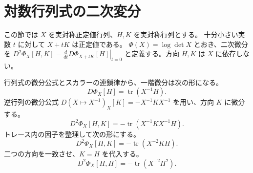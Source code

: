 \documentclass[a4paper,10pt]{ltjsarticle}
\begin{document}
\newpage
\section*{対数行列式の二次変分}
この節では $X$ を実対称正定値行列、$H,K$ を実対称行列とする。
十分小さい実数 $t$ に対して $X+tK$ は正定値である。
$\Phi(X)=\log\det X$ とおき、二次微分を
$D^2\Phi_X[H,K]=\left.\frac{d}{dt}D\Phi_{X+tK}[H]\right|_{t=0}$
と定義する。方向 $H,K$ は $X$ に依存しない。

行列式の微分公式とスカラーの連鎖律から、一階微分は次の形になる。
\begin{equation}
 D\Phi_X[H]=\operatorname{tr}(X^{-1}H).
 \label{logdet-first}
\end{equation}
逆行列の微分公式
$D(X\mapsto X^{-1})_X[K]=-X^{-1}KX^{-1}$ を用い、方向 $K$ に微分する。
\begin{equation}
 D^2\Phi_X[H,K]=-\operatorname{tr}(X^{-1}KX^{-1}H).
 \label{logdet-second}
\end{equation}
トレース内の因子を整理して次の形にする。
\begin{equation}
 D^2\Phi_X[H,K]=-\operatorname{tr}(X^{-2}KH).
 \label{logdet-collected}
\end{equation}
二つの方向を一致させ、$K=H$ を代入する。
\begin{equation}
 D^2\Phi_X[H,H]=-\operatorname{tr}(X^{-2}H^2).
 \label{logdet-directional}
\end{equation}
\end{document}
